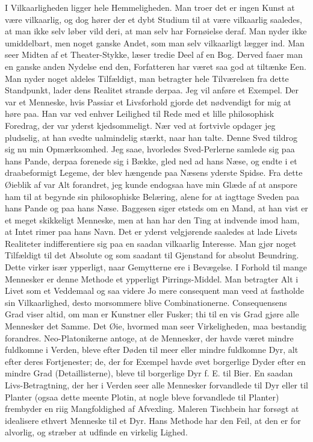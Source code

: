 \documentclass[12pt,a4paper]{article}
\begin{document}
I Vilkaarligheden ligger hele Hemmeligheden. Man troer det er ingen Kunst at være vilkaarlig, og dog hører der et dybt Studium til at være vilkaarlig saaledes, at man ikke selv løber vild deri, at man selv har Fornøielse deraf. Man nyder ikke umiddelbart, men noget ganske Andet, som man selv vilkaarligt lægger ind. Man seer Midten af et Theater-Stykke, læser tredie Deel af en Bog. Derved faaer man en ganske anden Nydelse end den, Forfatteren har været saa god at tiltænke Een. Man nyder noget aldeles Tilfældigt, man betragter hele Tilværelsen fra dette Standpunkt, lader dens Realitet strande derpaa. Jeg vil anføre et Exempel. Der var et Menneske, hvis Passiar et Livsforhold gjorde det nødvendigt for mig at høre paa. Han var ved enhver Leilighed til Rede med et lille philosophisk Foredrag, der var yderst kjedsommeligt. Nær ved at fortvivle opdager jeg pludselig, at han svedte ualmindelig stærkt, naar han talte. Denne Sved tildrog sig nu min Opmærksomhed. Jeg saae, hvorledes Sved-Perlerne samlede sig paa hans Pande, derpaa forenede sig i Bække, gled ned ad hans Næse, og endte i et draabeformigt Legeme, der blev hængende paa Næsens yderste Spidse. Fra dette Øieblik af var Alt forandret, jeg kunde endogsaa have min Glæde af at anspore ham til at begynde sin philosophiske Belæring, alene for at iagttage Sveden paa hans Pande og paa hans Næse. Baggesen siger etsteds om en Mand, at han vist er et meget skikkeligt Menneske, men at han har den Ting at indvende imod ham, at Intet rimer paa hans Navn. Det er yderst velgjørende saaledes at lade Livets Realiteter indifferentiere sig paa en saadan vilkaarlig Interesse. Man gjør noget Tilfældigt til det Absolute og som saadant til Gjenstand for absolut Beundring. Dette virker især ypperligt, naar Gemytterne ere i Bevægelse. I Forhold til mange Mennesker er denne Methode et ypperligt Pirrings-Middel. Man betragter Alt i Livet som et Veddemaal og saa videre Jo mere consequent man veed at fastholde sin Vilkaarlighed, desto morsommere blive Combinationerne. Consequensens Grad viser altid, om man er Kunstner eller Fusker; thi til en vis Grad gjøre alle Mennesker det Samme. Det Øie, hvormed man seer Virkeligheden, maa bestandig forandres. Neo-Platonikerne antoge, at de Mennesker, der havde været mindre fuldkomne i Verden, bleve efter Døden til meer eller mindre fuldkomne Dyr, alt efter deres Fortjenester; de, der for Exempel havde øvet borgerlige Dyder efter en mindre Grad (Detaillisterne), bleve til borgerlige Dyr f. E. til Bier. En saadan Livs-Betragtning, der her i Verden seer alle Mennesker forvandlede til Dyr eller til Planter (ogsaa dette meente Plotin, at nogle bleve forvandlede til Planter) frembyder en riig Mangfoldighed af Afvexling. Maleren Tischbein har forsøgt at idealisere ethvert Menneske til et Dyr. Hans Methode har den Feil, at den er for alvorlig, og stræber at udfinde en virkelig Lighed.
\end{document}
